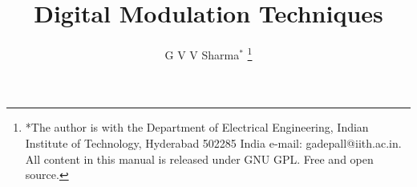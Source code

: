 \documentclass[journal,12pt,twocolumn]{IEEEtran}
\begin{document}
\let\StandardTheFigure\thefigure
\let\vec\mathbf
\renewcommand{\thefigure}{\theproblem}



\def\putbox#1#2#3{\makebox[0in][l]{\makebox[#1][l]{}\raisebox{\baselineskip}[0in][0in]{\raisebox{#2}[0in][0in]{#3}}}}
     \def\rightbox#1{\makebox[0in][r]{#1}}
     \def\centbox#1{\makebox[0in]{#1}}
     \def\topbox#1{\raisebox{-\baselineskip}[0in][0in]{#1}}
     \def\midbox#1{\raisebox{-0.5\baselineskip}[0in][0in]{#1}}

\vspace{3cm}

\title{
Digital Modulation Techniques
}
\author{ G V V Sharma$^{*}$%
	\thanks{*The author is with the Department
		of Electrical Engineering, Indian Institute of Technology, Hyderabad
		502285 India e-mail:  gadepall@iith.ac.in. All content in this manual is released under GNU GPL.  Free and open source.}
	
}	


%
%
%

% 
%
\end{document}
